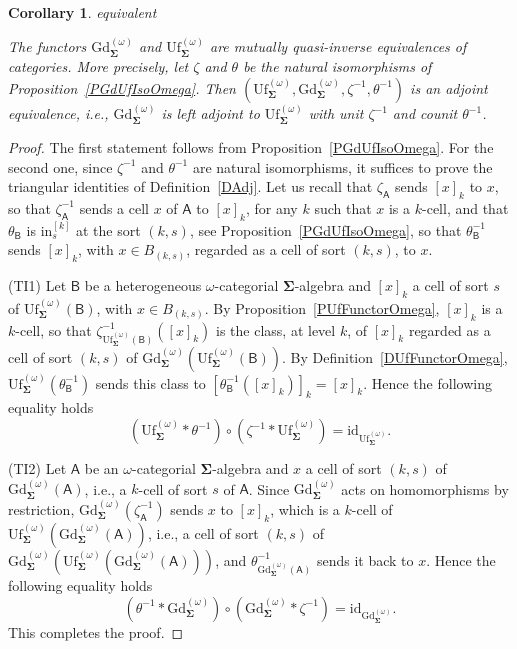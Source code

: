 \documentclass[a4paper, reqno]{amsbook}
\makeatletter
\newcommand{\sig}[1]{\mathbf{#1}}             %
\newcommand{\calg}[1]{\boldsymbol{\mathsf{#1}}} %
\newcommand{\id}{\mathrm{id}}
\newcommand{\Gd}{\mathrm{Gd}}
\newcommand{\Uf}{\mathrm{Uf}}
\theoremstyle{plain}
\newtheorem{corollary}[theorem]{Corollary}
\theoremstyle{definition}
\newcommand*{\CA@leanpending}{}
\newcommand*{\CA@leanrelation}{}
\newcommand*{\lean}[2]{%
  \ifcsname\string\color@lean@#1\endcsname\else
    \PackageError{main}{Unknown relation `#1' in \string\lean}{Use equivalent, weaker or stronger.}%
  \fi
  \gdef\CA@leanrelation{#1}%
  \gdef\CA@leanpending{#2}}
\makeatother
\begin{document}
\begin{corollary}\label{CGdUfEquivOmega}\lean{equivalent}{Omega.presentationEquivalence}
The functors $\Gd^{(\omega)}_{\sig{\Sigma}}$ and $\Uf^{(\omega)}_{\sig{\Sigma}}$ are mutually quasi-inverse equivalences of categories.
More precisely, let $\zeta$ and $\theta$ be the natural isomorphisms of Proposition~\ref{PGdUfIsoOmega}.
Then $(\Uf^{(\omega)}_{\sig{\Sigma}},\Gd^{(\omega)}_{\sig{\Sigma}},\zeta^{-1},\theta^{-1})$ is an adjoint equivalence, i.e., $\Gd^{(\omega)}_{\sig{\Sigma}}$ is left adjoint to $\Uf^{(\omega)}_{\sig{\Sigma}}$ with unit $\zeta^{-1}$ and counit $\theta^{-1}$.
\end{corollary}
\begin{proof}
The first statement follows from Proposition~\ref{PGdUfIsoOmega}.
For the second one, since $\zeta^{-1}$ and $\theta^{-1}$ are natural isomorphisms, it suffices to prove the triangular identities of Definition~\ref{DAdj}.
Let us recall that $\zeta_{\calg{A}}$ sends $[x]_{k}$ to $x$, so that $\zeta^{-1}_{\calg{A}}$ sends a cell $x$ of $\calg{A}$ to $[x]_{k}$, for any $k$ such that $x$ is a $k$-cell, and that $\theta_{\calg{B}}$ is $\mathrm{in}^{[k]}_{s}$ at the sort $(k,s)$, see Proposition~\ref{PGdUfIsoOmega}, so that $\theta^{-1}_{\calg{B}}$ sends $[x]_{k}$, with $x\in B_{(k,s)}$, regarded as a cell of sort $(k,s)$, to $x$.

(TI1) Let $\calg{B}$ be a heterogeneous $\omega$-categorial $\sig{\Sigma}$-algebra and $[x]_{k}$ a cell of sort $s$ of $\Uf^{(\omega)}_{\sig{\Sigma}}(\calg{B})$, with $x\in B_{(k,s)}$.
By Proposition~\ref{PUfFunctorOmega}, $[x]_{k}$ is a $k$-cell, so that $\zeta^{-1}_{\Uf^{(\omega)}_{\sig{\Sigma}}(\calg{B})}([x]_{k})$ is the class, at level $k$, of $[x]_{k}$ regarded as a cell of sort $(k,s)$ of $\Gd^{(\omega)}_{\sig{\Sigma}}(\Uf^{(\omega)}_{\sig{\Sigma}}(\calg{B}))$.
By Definition~\ref{DUfFunctorOmega}, $\Uf^{(\omega)}_{\sig{\Sigma}}(\theta^{-1}_{\calg{B}})$ sends this class to $[\theta^{-1}_{\calg{B}}([x]_{k})]_{k}=[x]_{k}$.
Hence the following equality holds
$$
(\Uf^{(\omega)}_{\sig{\Sigma}}\ast\theta^{-1})\circ(\zeta^{-1}\ast\Uf^{(\omega)}_{\sig{\Sigma}})=\id_{\Uf^{(\omega)}_{\sig{\Sigma}}}.
$$

(TI2) Let $\calg{A}$ be an $\omega$-categorial $\sig{\Sigma}$-algebra and $x$ a cell of sort $(k,s)$ of $\Gd^{(\omega)}_{\sig{\Sigma}}(\calg{A})$, i.e., a $k$-cell of sort $s$ of $\calg{A}$.
Since $\Gd^{(\omega)}_{\sig{\Sigma}}$ acts on homomorphisms by restriction, $\Gd^{(\omega)}_{\sig{\Sigma}}(\zeta^{-1}_{\calg{A}})$ sends $x$ to $[x]_{k}$, which is a $k$-cell of $\Uf^{(\omega)}_{\sig{\Sigma}}(\Gd^{(\omega)}_{\sig{\Sigma}}(\calg{A}))$, i.e., a cell of sort $(k,s)$ of $\Gd^{(\omega)}_{\sig{\Sigma}}(\Uf^{(\omega)}_{\sig{\Sigma}}(\Gd^{(\omega)}_{\sig{\Sigma}}(\calg{A})))$, and $\theta^{-1}_{\Gd^{(\omega)}_{\sig{\Sigma}}(\calg{A})}$ sends it back to $x$.
Hence the following equality holds
$$
(\theta^{-1}\ast\Gd^{(\omega)}_{\sig{\Sigma}})\circ(\Gd^{(\omega)}_{\sig{\Sigma}}\ast\zeta^{-1})=\id_{\Gd^{(\omega)}_{\sig{\Sigma}}}.
$$
This completes the proof.
\end{proof}
\end{document}
